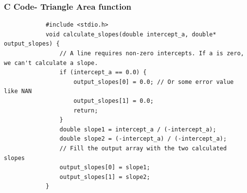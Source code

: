 \documentclass{beamer}
\begin{document}
	
	\begin{frame}[fragile]
		\frametitle{C Code- Triangle Area function }
		
		\begin{lstlisting}
			#include <stdio.h>
			void calculate_slopes(double intercept_a, double* output_slopes) {
				// A line requires non-zero intercepts. If a is zero, we can't calculate a slope.
				if (intercept_a == 0.0) {
					output_slopes[0] = 0.0; // Or some error value like NAN
					output_slopes[1] = 0.0;
					return;
				}
				double slope1 = intercept_a / (-intercept_a);
				double slope2 = (-intercept_a) / (-intercept_a);
				// Fill the output array with the two calculated slopes
				output_slopes[0] = slope1;
				output_slopes[1] = slope2;
			}
		\end{lstlisting}
	\end{frame}
	
\end{document}
